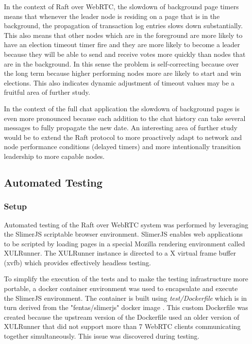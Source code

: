 \documentclass[9pt]{extarticle}
\begin{document}
\begin{multicols}{2}
In the context of Raft over WebRTC, the slowdown of background page
timers means that whenever the leader node is residing on a page that
is in the background, the propagation of transaction log entries slows
down substantially. This also means that other nodes which are in the
foreground are more likely to have an election timeout timer fire and
they are more likely to become a leader because they will be able to
send and receive votes more quickly than nodes that are in the
background.  In this sense the problem is self-correcting because over
the long term because higher performing nodes more are likely to start
and win elections. This also indicates dynamic adjustment of timeout
values may be a fruitful area of further study.

In the context of the full chat application the slowdown of background
pages is even more pronounced because each addition to the chat
history can take several messages to fully propagate the new date. An
interesting area of further study would be to extend the Raft protocol
to more proactively adapt to network and node performance conditions
(delayed timers) and more intentionally transition leadership to more
capable nodes.


\subsection{Automated Testing}

\subsubsection{Setup}

Automated testing of the Raft over WebRTC system was performed by
leveraging the SlimerJS scriptable browser environment. SlimerJS
enables web applications to be scripted by loading pages in a special
Mozilla rendering environment called XULRunner. The XULRunner instance
is directed to a X virtual frame buffer (xvfb) which provides
effectively headless testing.

To simplify the execution of the tests and to make the testing
infrastructure more portable, a docker container environment was used
to encapsulate and execute the SlimerJS environment. The container is
built using \emph{test/Dockerfile} which is in turn derived from
the "fentas/slimerjs" docker image \cite{fentas:slimerjs}.
This custom Dockerfile was created because the upstream version of the
Dockerfile used an older version of XULRunner that did not support
more than 7 WebRTC clients communicating together simultaneously. This
issue was discovered during testing.


\end{multicols}
\end{document}
